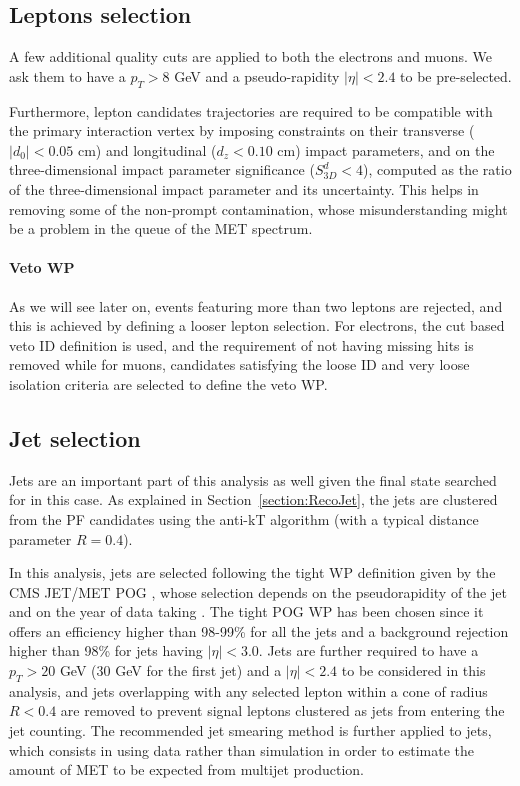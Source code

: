 \documentclass[a4paper, 10pt, openright]{report}
\begin{document}
\subsection{Leptons selection} \label{section:LepSel}

A few additional quality cuts are applied to both the electrons and muons. We ask them to have a $p_T > 8$ GeV and a pseudo-rapidity $|\eta| < 2.4$ to be pre-selected.

Furthermore, lepton candidates trajectories are required to be compatible with the primary interaction vertex by imposing constraints on their transverse ($|d_0| < 0.05$ cm) and longitudinal ($d_z < 0.10$ cm) impact parameters, and on the three-dimensional impact parameter significance ($S^d_{3D} < 4$), computed as the ratio of the three-dimensional impact parameter and its uncertainty. This helps in removing some of the non-prompt contamination, whose misunderstanding might be a problem in the queue of the \ac{MET} spectrum.

\paragraph{Veto \ac{WP}}

As we will see later on, events featuring more than two leptons are rejected, and this is achieved by defining a looser lepton selection. For electrons, the cut based veto ID definition is used, and the requirement of not having missing hits is removed while for muons, candidates satisfying the loose ID and very loose isolation criteria are selected to define the veto \ac{WP}.

\subsection{Jet selection} \label{section:JetSel}

Jets are an important part of this analysis as well given the final state searched for in this case. As explained in Section~\ref{section:RecoJet}, the jets are clustered from the \ac{PF} candidates using the anti-kT algorithm (with a typical distance parameter $R = 0.4$). 

In this analysis, jets are selected following the tight \ac{WP} definition given by the \ac{CMS} JET/MET \ac{POG} \cite{JETMETPOG}, whose selection depends on the pseudorapidity of the jet and on the year of data taking \cite{JetWPs}. The tight \ac{POG} \ac{WP} has been chosen since it offers an efficiency higher than 98-99\% for all the jets and a background rejection higher than 98\% for jets having $|\eta| < 3.0$. Jets are further required to have a $p_T > 20$ GeV ($30$ GeV for the first jet) and a $|\eta| < 2.4$ to be considered in this analysis, and jets overlapping with any selected lepton within a cone of radius $R < 0.4$ are removed to prevent signal leptons clustered as jets from entering the jet counting. The recommended jet smearing method is further applied to jets, which consists in using data rather than simulation in order to estimate the amount of \ac{MET} to be expected from multijet production.
\end{document}
